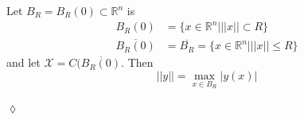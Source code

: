 \begin{example}
Let $B_R=B_R(0)\subset\mathbb{R}^n$ is
\begin{align*}
B_R(0) &= \{x\in\mathbb{R}^n | ||x||\subset R\} \\
\overline{B_R(0)} &= \overline{B_R} = \{x\in\mathbb{R}^n | ||x||\leq R\}
\end{align*}
and let $\mathcal{X}=C(\overline{B_R(0)}$. Then
$$||y||=\max_{x\in B_R} |y(x)|$$
\end{example}
$\lozenge$


% 

